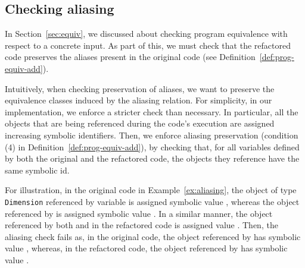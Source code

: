 \documentclass[sigconf,review,anonymous]{acmart}
\begin{document}


\subsection{Checking aliasing}

In Section~\ref{sec:equiv}, we discussed about checking program equivalence with respect to a concrete input. As part of this, 
we must check that the refactored code preserves the aliases present in the original code (see Definition~\ref{def:prog-equiv-add}).



Intuitively, when checking preservation of aliases, we want to preserve the equivalence classes induced by the aliasing relation.
For simplicity, in our implementation, we enforce a stricter check than necessary.
In particular, all the objects
that are being referenced during the code's execution
are assigned increasing symbolic identifiers.
Then, we enforce aliasing preservation (condition (4) in Definition~\ref{def:prog-equiv-add}),
by checking that, for all variables defined by both the original and the refactored code,
the objects they reference have the same symbolic id.

For illustration, in the original code in Example~\ref{ex:aliasing}, the object of type \texttt{Dimension} referenced by variable 
is assigned symbolic value , whereas the object referenced by  is assigned symbolic value .
In a similar manner, the object referenced by both  and  in the refactored code is assigned value .
Then, the aliasing check fails as, in the original code, the object referenced by  has symbolic value ,
whereas, in the refactored code, the object referenced by  has symbolic value .
\end{document}
